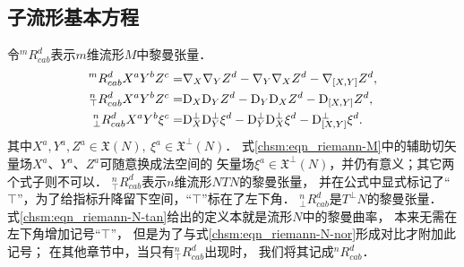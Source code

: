 \subsection{子流形基本方程}
令${}^{m}R^d_{cab}$表示$m$维流形$M$中黎曼张量．
\begin{subequations}\label{chsm:eqn_riemann-MN-TN}
\begin{align}
    {}^{m}R^d_{cab}X^aY^bZ^c=& {\nabla}_X {\nabla}_Y Z^d -{\nabla}_Y {\nabla}_X Z^d
       - {\nabla}_{[X,Y]} Z^d , \label{chsm:eqn_riemann-M} \\
    {}^{n}_{\top}R^d_{cab}X^aY^bZ^c=& {\rm D}_X {\rm D}_Y Z^d -{\rm D}_Y {\rm D}_X Z^d
       - {\rm D}_{[X,Y]} Z^d, \label{chsm:eqn_riemann-N-tan} \\
    {}^{n}_{\bot}R^d_{cab}X^aY^b \xi^c=& {\rm D}_X^\bot {\rm D}^\bot_Y \xi^d -{\rm D}^\bot_Y {\rm D}^\bot_X \xi^d
       - {\rm D}^\bot_{[X,Y]} \xi^d. \label{chsm:eqn_riemann-N-nor}
\end{align}
\end{subequations}
其中$X^a,Y^a,Z^a\in \mathfrak{X}(N), \ \xi^a \in \mathfrak{X}^\bot (N)$．
式\eqref{chsm:eqn_riemann-M}中的辅助切矢量场$X^a$、$Y^a$、$Z^a$可随意换成法空间的
矢量场$\xi^a\in \mathfrak{X}^\bot(N)$，并仍有意义；其它两个式子则不可以．
${}^{n}_{\top}R^d_{cab}$表示$n$维流形$N$$T N$的黎曼张量，
并在公式中显式标记了“$\top$”，为了给指标升降留下空间，“$\top$”标在了左下角．
${}^{n}_{\bot}R^d_{cab}$是$T^\bot N$的黎曼张量．
式\eqref{chsm:eqn_riemann-N-tan}给出的定义本就是流形$N$中的黎曼曲率，
本来无需在左下角增加记号“$\top$”，
但是为了与式\eqref{chsm:eqn_riemann-N-nor}形成对比才附加此记号；
在其他章节中，当只有${}^{n}_{\top}R^d_{cab}$出现时，
我们将其记成${}^{n}R^d_{cab}$．

